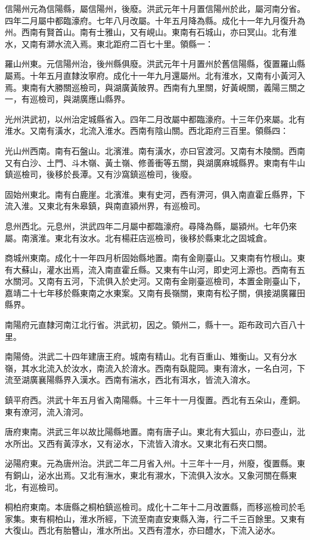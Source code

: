信陽州元為信陽縣，屬信陽州，後廢。洪武元年十月置信陽州於此，屬河南分省。四年二月屬中都臨濠府。七年八月改屬。十年五月降為縣。成化十一年九月復升為州。西南有賢首山。南有士雅山，又有峴山。東南有石城山，亦曰冥山。北有淮水，又南有溮水流入焉。東北距府二百七十里。領縣一：

羅山州東。元信陽州治，後州縣俱廢。洪武元年十月置州於舊信陽縣，復置羅山縣屬焉。十年五月直隸汝寧府。成化十一年九月還屬州。北有淮水，又南有小黃河入焉。東南有大勝關巡檢司，與湖廣黃陂界。西南有九里關，好黃峴關，義陽三關之一，有巡檢司，與湖廣應山縣界。

光州洪武初，以州治定城縣省入。四年二月改屬中都臨濠府。十三年仍來屬。北有淮水。又南有潢水，北流入淮水。西南有陰山關。西北距府三百里。領縣四：

光山州西南。南有石盤山。北濱淮。南有潢水，亦曰官渡河。又南有木陵關。西南又有白沙、土門、斗木嶺、黃土嶺、修善衝等五關，與湖廣麻城縣界。東南有牛山鎮巡檢司，後移於長潭。又有沙窩鎮巡檢司，後廢。

固始州東北。南有白鹿崖。北濱淮。東有史河，西有淠河，俱入南直霍丘縣界，下流入淮。又東北有朱皋鎮，與南直潁州界，有巡檢司。

息州西北。元息州，洪武四年二月屬中都臨濠府。尋降為縣，屬潁州。七年仍來屬。南濱淮。東北有汝水。北有楊莊店巡檢司，後移於縣東北之固城倉。

商城州東南。成化十一年四月析固始縣地置。南有金剛臺山。又東南有竹根山。東有大蘇山，灌水出焉，流入南直霍丘縣。又東有牛山河，即史河上源也。西南有五水關河。又南有五河，下流俱入於史河。又南有金剛臺巡檢司，本置金剛臺山下，嘉靖二十七年移於縣東南之水東案。又南有長嶺關，東南有松子關，俱接湖廣羅田縣界。

南陽府元直隸河南江北行省。洪武初，因之。領州二，縣十一。距布政司六百八十里。

南陽倚。洪武二十四年建唐王府。城南有精山。北有百重山、雉衡山。又有分水嶺，其水北流入於汝水，南流入於淯水。西南有臥龍岡。東有淯水，一名白河，下流至湖廣襄陽縣界入漢水。西南有湍水，西北有洱水，皆流入淯水。

鎮平府西。洪武十年五月省入南陽縣。十三年十一月復置。西北有五朵山，產銅。東有潦河，流入淯河。

唐府東南。洪武三年以故比陽縣地置。南有唐子山。東北有大狐山，亦曰壺山，沘水所出。又西有黃淳水，又有泌水，下流皆入淯水。又東北有石夾口關。

泌陽府東。元為唐州治。洪武二年二月省入州。十三年十一月，州廢，復置縣。東有銅山，泌水出焉。又北有潕水，東北有瀙水，下流俱入汝水。又象河關在縣東北，有巡檢司。

桐柏府東南。本唐縣之桐柏鎮巡檢司。成化十二年十二月改置縣，而移巡檢司於毛家集。東有桐柏山，淮水所經，下流至南直安東縣入海，行二千三百餘里。又東有大復山。西北有胎簪山，淮水所出。又西有澧水，亦曰醴水，下流入泌水。

